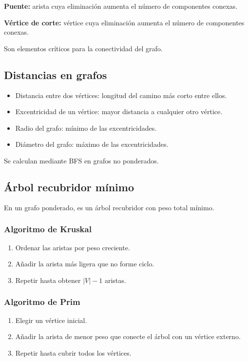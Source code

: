 \documentclass[12pt]{article}
\theoremstyle{plain}
\theoremstyle{definition}
\theoremstyle{remark}
\begin{document}
\textbf{Puente:} arista cuya eliminación aumenta el número de componentes conexas.

\textbf{Vértice de corte:} vértice cuya eliminación aumenta el número de componentes conexas.

Son elementos críticos para la conectividad del grafo.

\subsection*{Distancias en grafos}

\begin{itemize}
    \item Distancia entre dos vértices: longitud del camino más corto entre ellos.
    \item Excentricidad de un vértice: mayor distancia a cualquier otro vértice.
    \item Radio del grafo: mínimo de las excentricidades.
    \item Diámetro del grafo: máximo de las excentricidades.
\end{itemize}

Se calculan mediante BFS en grafos no ponderados.

\subsection*{Árbol recubridor mínimo}

En un grafo ponderado, es un árbol recubridor con peso total mínimo.

\subsubsection*{Algoritmo de Kruskal}

\begin{enumerate}
    \item Ordenar las aristas por peso creciente.
    \item Añadir la arista más ligera que no forme ciclo.
    \item Repetir hasta obtener $|V|-1$ aristas.
\end{enumerate}

\subsubsection*{Algoritmo de Prim}

\begin{enumerate}
    \item Elegir un vértice inicial.
    \item Añadir la arista de menor peso que conecte el árbol con un vértice externo.
    \item Repetir hasta cubrir todos los vértices.
\end{enumerate}
\end{document}
